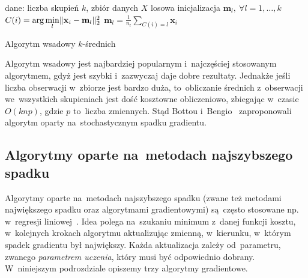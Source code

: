 \documentclass{praca1}
\DeclarePairedDelimiter{\norm}{\lVert}{\rVert}
\begin{document}
\begin{algorithm}[!h]
\begin{algorithmic}[1]
		\State dane: liczba skupień $k$, zbiór danych $X$
        \State losowa inicjalizacja $\mathbf{m}_l , \ \forall l=1, \ldots, k$
        \Repeat
                \State $C(i) = \arg \min\limits_{l} \norm{\mathbf{x}_i - \mathbf{m}_l }_2^2 $
            \EndFor
                \State $\mathbf{m}_l = \frac{1}{n_l}\sum\limits_{C(i) = l} \mathbf{x}_i$
            \EndFor

\end{algorithmic}
\caption{Algorytm wsadowy $k$-średnich}\label{alg:001}
\end{algorithm}

Algorytm wsadowy jest najbardziej popularnym i~najczęściej stosowanym algorytmem, gdyż jest szybki i~zazwyczaj daje dobre rezultaty. Jednakże jeśli liczba obserwacji w~zbiorze jest bardzo duża, to~obliczanie średnich z~obserwacji we~wszystkich skupieniach jest dość kosztowne obliczeniowo, zbiegając w~czasie $O(knp)$, gdzie $p$ to~liczba zmiennych. Stąd Bottou i~Bengio~\cite{Bottou1995:convergenceproperties} zaproponowali algorytm oparty na~stochastycznym spadku gradientu.

\subsection{Algorytmy oparte na~metodach najszybszego spadku}

Algorytmy oparte na~metodach najszybszego spadku (zwane też metodami największego spadku oraz algorytmami gradientowymi) są~często stosowane np. w~regresji liniowej~\cite{Bottou2012:sgdtricks}. Idea polega na~szukaniu minimum z~danej funkcji kosztu, w~kolejnych krokach algorytmu aktualizując zmienną, w~kierunku, w~którym spadek gradientu był największy. Każda aktualizacja zależy od~parametru, zwanego \emph{parametrem uczenia}, który musi być odpowiednio dobrany. W~niniejszym podrozdziale opiszemy trzy algorytmy gradientowe.

\end{document}
